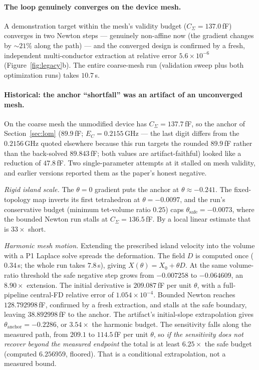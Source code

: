\documentclass{anvil-paper}
\begin{document}
\paragraph{The loop genuinely converges on the device mesh.} A
demonstration target within the mesh's validity budget ($C_\Sigma =
137.0$\,fF) converges in two Newton steps --- genuinely non-affine now
(the gradient changes by ${\sim}21\%$ along the path) --- and the
converged design
is confirmed by a fresh, independent multi-conductor extraction at
relative error $5.6\times10^{-6}$ (Figure~\ref{fig:legacy}b). The
entire coarse-mesh run (validation sweep plus both optimization runs)
takes $10.7$\,s.

\paragraph{Historical: the anchor ``shortfall'' was an artifact of an
unconverged mesh.}
On the coarse mesh the unmodified device has $C_\Sigma = 137.7$\,fF, so
the anchor of Section~\ref{sec:lom} ($89.9$\,fF; $E_C = 0.2155$\,GHz ---
the last digit differs from the $0.2156$\,GHz quoted elsewhere because
this run targets the rounded $89.9$\,fF rather than the back-solved
$89.843$\,fF; both values are artifact-faithful) looked like a
reduction of $47.8$\,fF. Two single-parameter attempts at it stalled on
mesh validity, and earlier versions reported them as the paper's honest
negative.

\emph{Rigid island scale.} The $\theta = 0$ gradient puts the anchor at
$\theta \approx -0.241$. The fixed-topology map inverts its first
tetrahedron at $\theta = -0.0097$, and the run's conservative budget
(minimum tet-volume ratio $0.25$) caps
$\theta_{\mathrm{safe}} = -0.0073$, where the bounded Newton run stalls
at $C_\Sigma = 136.5$\,fF. By a local linear estimate that is
$33\times$ short.

\emph{Harmonic mesh motion.} Extending the prescribed island velocity
into the volume with a P1 Laplace solve spreads the deformation. The
field $D$ is computed once ($0.34$\,s; the whole run takes $7.8$\,s),
giving $X(\theta)=X_0+\theta D$. At the same volume-ratio threshold the
safe negative step grows from $-0.007258$ to $-0.064609$, an
$8.90\times$ extension. The initial derivative is $209.087$\,fF per
unit $\theta$, with a full-pipeline central-FD relative error of
$1.054\times10^{-4}$. Bounded Newton reaches $128.792998$\,fF,
confirmed by a fresh extraction, and stalls at the safe boundary,
leaving $38.892998$\,fF to the anchor. The artifact's initial-slope
extrapolation gives $\theta_{\mathrm{anchor}}=-0.2286$, or $3.54\times$
the harmonic budget. The sensitivity falls along the measured path,
from $209.1$ to $114.5$\,fF per unit $\theta$, so \emph{if the
sensitivity does not recover beyond the measured endpoint} the total
is at least $6.25\times$ the safe budget (computed $6.256959$,
floored). That is a conditional extrapolation, not a measured bound.
\end{document}
